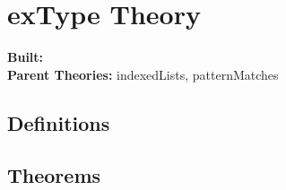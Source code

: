 \documentclass[11pt, twoside]{article}
\begin{document}


\tableofcontents
\cleardoublepage
\HOLpagestyle

\section{exType Theory}
\begin{flushleft}
\textbf{Built:} \HOLexTypeDate \\[2pt]
\textbf{Parent Theories:} indexedLists, patternMatches
\end{flushleft}


\subsection{Definitions}

\HOLexTypeDefinitions

\subsection{Theorems}

\HOLexTypeTheorems

\HOLindex
\end{document}
